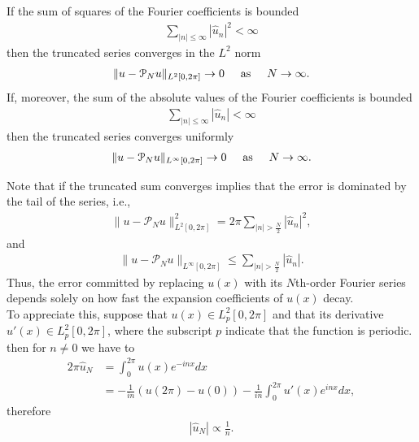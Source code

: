 	\begin{teor}
		 If the sum of squares of the Fourier coefficients is bounded
		\begin{align*}
			\displaystyle \sum_{ |n| \leq \infty} |\hat{u}_n|^2 < \infty
		\end{align*}
		then the truncated series converges in the $L^2$ norm
		\begin{align*}
			\|u -  \mathcal{P}_N u \|_{L^2 [0, 2\pi]} \rightarrow 0 \hspace{0.5cm} \text{as} \hspace{0.5cm} N \rightarrow \infty.
		\end{align*}
		If, moreover, the sum of the absolute values of the Fourier coefficients is bounded
		\begin{align*}
			\displaystyle \sum_{ |n| \leq \infty} |\hat{u}_n| < \infty
		\end{align*}
		then the truncated series converges uniformly 
		\begin{align*}
			\|u -  \mathcal{P}_N u \|_{L^{\infty} [0, 2\pi]} \rightarrow 0 \hspace{0.5cm} \text{as} \hspace{0.5cm} N \rightarrow \infty. 
		\end{align*}
	\end{teor}
	
	Note that if the truncated sum converges implies that the error is dominated by the tail of the series, i.e.,
	\begin{align*}
		\|u -  \mathcal{P}_N u \|^2_{L^2 [0, 2\pi]} = 2 \pi	\displaystyle \sum_{ |n| > \frac{N}{2} } |\hat{u}_n|^2,
	\end{align*}	
	and	
	\begin{align*}
		\|u -  \mathcal{P}_N u \|_{L^{\infty} [0, 2\pi]} \leq 
		\displaystyle \sum_{|n| > \frac{N}{2}} |\hat{u}_n|. 
	\end{align*}
	Thus, the error committed by replacing $u(x)$ with its $N$th-order Fourier series depends solely on how fast the expansion coefficients of $u(x)$ decay. \\
	
	To appreciate this, suppose that $u(x) \in L^2_p [0, 2 \pi]$ and that its derivative $u'(x) \in L^2_p [0, 2\pi]$, where the subscript $p$ indicate that the function is periodic. then for $n \neq 0$ we have to
	\begin{align*}
		2\pi \hat{u}_N &= \displaystyle \int_{0}^{2\pi} u(x) e^{-inx} dx \\
		&= - \frac{1}{in} (u(2\pi) - u(0)) - \frac{1}{in} \displaystyle \int_{0}^{2\pi} u'(x) e^{inx} dx, 
	\end{align*}
	therefore
	\begin{align*}
		|\hat{u}_N| \propto \frac{1}{n}.
	\end{align*}
	
